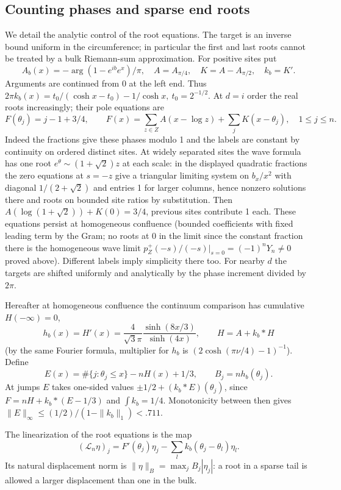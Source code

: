 \subsection{Counting phases and sparse end roots}

We detail the analytic control of the root equations. The target is an inverse bound uniform in the circumference; in particular the first and last roots cannot be treated by a bulk Riemann-sum approximation. For positive sites put
\[
 A_b(x)=-\arg(1-e^{ib}e^x)/\pi,
 \quad A=A_{\pi/4},\quad K=A-A_{\pi/2},\quad k_b=K'.
\]
Arguments are continued from 0 at the left end. Thus
\(2\pi k_b(x)=t_0/(\cosh x-t_0)-1/\cosh x,\ t_0=2^{-1/2}\). At \(d=i\) order the real roots increasingly; their pole equations are
\[
 F(\theta_j)=j-1+3/4,\qquad
 F(x)=\sum_{z\in Z}A(x-\log z)+\sum_j K(x-\theta_j),\quad 1\le j\le n .
\]
Indeed the fractions give these phases modulo 1 and the labels are constant by continuity on ordered distinct sites. At widely separated sites the wave formula has one root \(e^{\theta}\sim(1+\sqrt2)z\) at each scale: in the displayed quadratic fractions the zero equations at \(s=-z\) give a triangular limiting system on \(b_x/x^2\) with diagonal \(1/(2+\sqrt2)\) and entries 1 for larger columns, hence nonzero solutions there and roots on bounded site ratios by substitution. Then \(A(\log(1+\sqrt2))+K(0)=3/4\), previous sites contribute 1 each. These equations persist at homogeneous confluence (bounded coefficients with fixed leading term by the Gram; no roots at 0 in the limit since the constant fraction there is the homogeneous wave limit \(p_Z^+(-s)/(-s)|_{s=0}=(-1)^n Y_n\ne0\) proved above). Different labels imply simplicity there too. For nearby \(d\) the targets are shifted uniformly and analytically by the phase increment divided by \(2\pi\).

Hereafter at homogeneous confluence the continuum comparison has cumulative \(H(-\infty)=0\),
\[
 h_b(x)=H'(x)=\frac{4}{\sqrt3\pi}\frac{\sinh(8x/3)}{\sinh(4x)},\qquad H=A+k_b*H
\]
(by the same Fourier formula, multiplier for \(h_b\) is \((2\cosh(\pi\nu/4)-1)^{-1}\)). Define
\[
 E(x)=\#\{j:\theta_j\le x\}-n H(x)+1/3,\qquad B_j=n h_b(\theta_j).
\]
At jumps \(E\) takes one-sided values \(\pm1/2+(k_b*E)(\theta_j)\), since \(F=nH+k_b*(E-1/3)\) and \(\int k_b=1/4\). Monotonicity between then gives \(\|E\|_\infty\le (1/2)/(1-\|k_b\|_1)<.711\).

The linearization of the root equations is the map
\[
 (\mathcal L_n\eta)_j
   =F'(\theta_j)\eta_j-\sum_l k_b(\theta_j-\theta_l)\eta_l.
\]
Its natural displacement norm is
$\|\eta\|_B=\max_j B_j|\eta_j|$: a root in a sparse tail is allowed
a larger displacement than one in the bulk.

